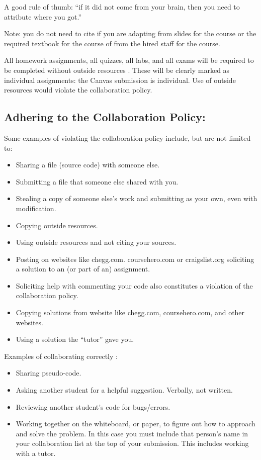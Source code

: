 A good rule of thumb: “if it did not come from your brain, then you need to attribute where you got.”

Note: you do not need to cite if you are adapting from slides for the course or the required textbook for the course of from the hired staff for the course.

All homework assignments, all quizzes, all labs, and all exams will be required to be completed without outside resources . These will be clearly marked as individual assignments: the Canvas submission is individual. Use of outside resources would violate the collaboration policy.

\subsection{Adhering to the Collaboration Policy:}

Some examples of violating the collaboration policy include, but are not limited to:

\begin{itemize}
    \item Sharing a file (source code) with someone else.
    \item Submitting a file that someone else shared with you.
    \item Stealing a copy of someone else’s work and submitting as your own, even with modification.
    \item Copying outside resources.
    \item Using outside resources and not citing your sources.
    \item Posting on websites like chegg.com. coursehero.com or craigslist.org soliciting a solution to an (or part of an) assignment.
    \item Soliciting help with commenting your code also constitutes a violation of the collaboration policy.
    \item Copying solutions from website like chegg.com, coursehero.com, and other websites.
    \item Using a solution the “tutor” gave you.
\end{itemize}

Examples of collaborating correctly :

\begin{itemize}
    \item Sharing pseudo-code.
    \item Asking another student for a helpful suggestion. Verbally, not written.
    \item Reviewing another student’s code for bugs/errors.
    \item Working together on the whiteboard, or paper, to figure out how to approach and solve the problem. In this case you must include that person’s name in your collaboration list at the top of your submission. This includes working with a tutor.
\end{itemize}

